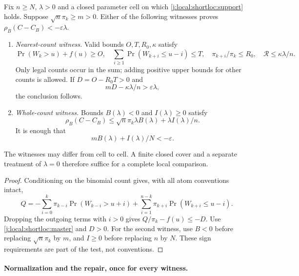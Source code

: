 \begin{samepage}
\begin{theorem}\label{j:local:shortloc:theorem}
Fix $n\ge N$, $\lambda>0$ and a closed parameter cell on which
\eqref{j:local:shortloc:support} holds. Suppose $\sqrt n\pi_k\ge m>0$.
Either of the following witnesses proves $\rho_B(C-C_B)<-\varepsilon\lambda$.
\begin{enumerate}
\item \emph{Nearest-count witness.} Valid bounds $O,T,R_0,\kappa$ satisfy
\[
 \Pr(W_k>u)+f(u)\ge O,\quad
 \sum_{i\ge1}\Pr(W_{k+i}\le u-i)\le T,\quad
 \pi_{k+i}/\pi_k\le R_0,\quad \mathcal R\le\kappa\lambda/n.
\]
Only legal counts occur in the sum; adding positive upper bounds for
other counts is allowed. If $D=O-R_0T>0$ and
\begin{equation}\label{j:local:shortloc:directtest}
             mD-\kappa\lambda/n>\varepsilon\lambda,
\end{equation}
the conclusion follows.
\item \emph{Whole-count witness.} Bounds $B(\lambda)<0$ and $I(\lambda)\ge0$
satisfy
\[
 \rho_B(C-C_B)\le\sqrt n\pi_k\lambda B(\lambda)
                                      +\lambda I(\lambda)/n.
\]
It is enough that
\begin{equation}\label{j:local:shortloc:whole-test}
                  mB(\lambda)+I(\lambda)/N<-\varepsilon.
\end{equation}
\end{enumerate}
The witnesses may differ from cell to cell. A finite closed cover and a
separate treatment of $\lambda=0$ therefore suffice for a complete local
comparison.
\end{theorem}
\end{samepage}
\begin{proof}
Conditioning on the binomial count gives, with all atom conventions intact,
\begin{equation}\label{j:local:shortloc:count}
 Q=-\sum_{i=0}^{k}\pi_{k-i}\Pr(W_{k-i}>u+i)
       +\sum_{i=1}^{n-k}\pi_{k+i}\Pr(W_{k+i}\le u-i).
\end{equation}
Dropping the outgoing terms with $i>0$ gives $Q/\pi_k-f(u)\le-D$.
Use \eqref{j:local:shortloc:master} and $D>0$. For the second witness, use
$B<0$ before replacing $\sqrt n\pi_k$ by $m$, and $I\ge0$ before replacing
$n$ by $N$. These sign requirements are part of the test, not conventions.
\end{proof}

\paragraph{Normalization and the repair, once for every witness.}


